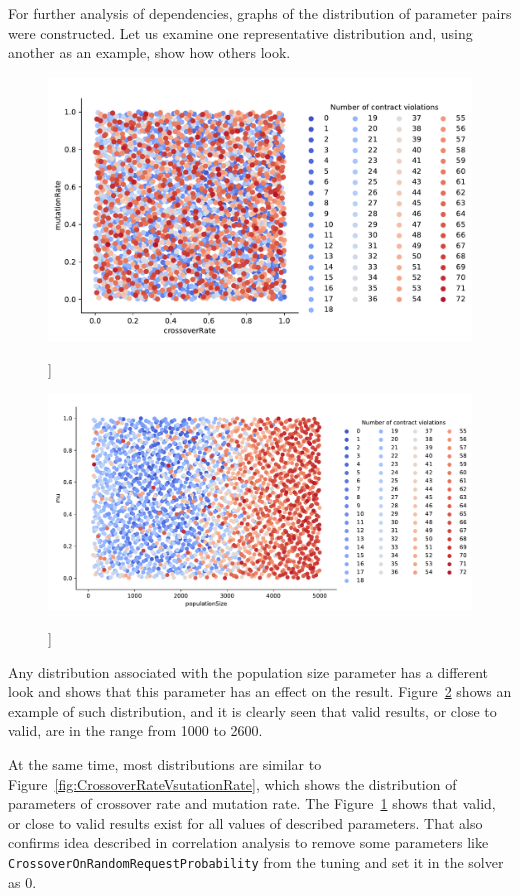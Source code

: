 For further analysis of dependencies, graphs of the distribution of parameter pairs were constructed. Let us examine one representative distribution and, using another as an example, show how others look.
\begin{figure}
	\centering
	\includegraphics[width=\textwidth]{images/CrossoverRateVsutationRate.pdf}
	\caption[]]{}
	\label{fig:CrossoverRateVmutationRate}
\end{figure}
\begin{figure}
	\centering
	\includegraphics[width=\textwidth]{images/populatioSizeVsMu.pdf}
	\caption[]]{}
	\label{fig:populatioSizeVsMu}
\end{figure}
Any distribution associated with the population size parameter has a different look and shows that this parameter has an effect on the result.
Figure~\ref{fig:populatioSizeVsMu} shows an example of such distribution, and it is clearly seen that valid results, or close to valid, are in the range from 1000 to 2600.

At the same time, most distributions are similar to Figure~\ref{fig:CrossoverRateVsutationRate}, which shows the distribution of parameters of crossover rate and mutation rate. 
The Figure~\ref{fig:CrossoverRateVmutationRate} shows that valid, or close to valid results exist for all values of described parameters. That also confirms idea described in correlation analysis to remove some parameters like \texttt{CrossoverOnRandomRequestProbability} from the tuning and set it in the solver as 0.



